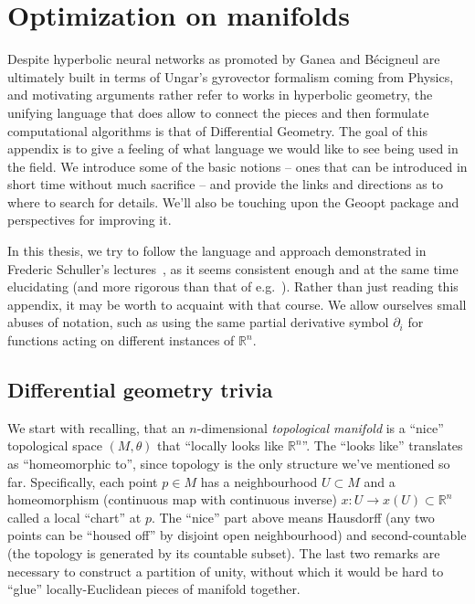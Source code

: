 \chapter{Optimization on manifolds} \label{chap:manifolds}


Despite hyperbolic neural networks as promoted by Ganea and B\'ecigneul are
ultimately built in terms of Ungar's gyrovector formalism coming from Physics,
and motivating arguments rather refer  to works in hyperbolic geometry, the
unifying language that does allow to connect the pieces and then formulate
computational algorithms is that of Differential Geometry. The goal of this appendix
is to give a feeling of what language we would like to see being used in the field.
We introduce some of the basic notions -- ones that can be introduced in short time
without much sacrifice -- and provide the links and directions as to where to search
for details.
We'll also be touching upon the Geoopt package and perspectives for improving
it.

In this thesis, we try to follow the language and approach demonstrated in
Frederic Schuller's lectures~\cite{geometricAnatomy,gravityLight}, as it seems
consistent enough and at the same time elucidating (and more rigorous than that
of e.g.~\citep{leeSmooth,leeRiem}). Rather than just reading this appendix, it
may be worth to acquaint with that course. We allow ourselves small abuses of
notation, such as using the same partial derivative symbol \( \partial_i \) for
functions acting on different instances of \( \mathbb{R}^n \).

\section{Differential geometry trivia}

We start with recalling, that an \( n \)-dimensional \emph{topological
manifold} is a ``nice'' topological space \( (M, \theta) \) that ``locally
looks like \(\mathbb{R}^n\)''.  The ``looks like'' translates as ``homeomorphic
to'', since topology is the only structure we've mentioned so far.
Specifically, each point \( p\in M \) has a neighbourhood \( U\subset M \) and
a homeomorphism (continuous map with continuous inverse) \( x:U \to
x(U)\subset\mathbb{R}^n \) called a local ``chart'' at \( p \).
The ``nice'' part above means Hausdorff (any two points can be ``housed off''
by disjoint open neighbourhood) and second-countable (the topology is generated
by its countable subset). The last two remarks are necessary to construct a
partition of unity, without which it would be hard to ``glue''
locally-Euclidean pieces of manifold together.

